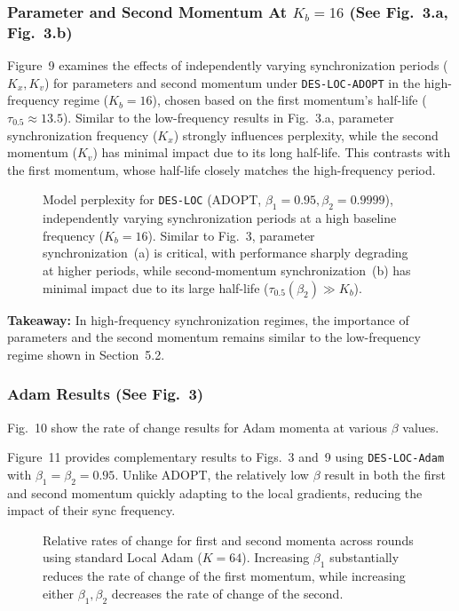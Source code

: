 \subsubsection{Parameter and Second Momentum At $K_b=16$ (See Fig.~3.a, Fig.~3.b)}
\label{sec:b21_param_second}

Figure~9 examines the effects of independently varying synchronization periods ($K_x, K_v$) for parameters and second momentum under \texttt{DES-LOC-ADOPT} in the high-frequency regime ($K_b=16$), chosen based on the first momentum's half-life ($\tau_{0.5}\approx 13.5$). Similar to the low-frequency results in Fig.~3.a, parameter synchronization frequency ($K_x$) strongly influences perplexity, while the second momentum ($K_v$) has minimal impact due to its long half-life. This contrasts with the first momentum, whose half-life closely matches the high-frequency period.

\begin{figure}[ht]
\centering
\caption{Model perplexity for \texttt{DES-LOC} (ADOPT, $\beta_1=0.95, \beta_2=0.9999$), independently varying synchronization periods at a high baseline frequency ($K_b=16$). Similar to Fig.~3, parameter synchronization~(a) is critical, with performance sharply degrading at higher periods, while second-momentum synchronization~(b) has minimal impact due to its large half-life ($\tau_{0.5}(\beta_2)\gg K_b$).}
\label{fig:9}
\end{figure}

\textbf{Takeaway:} In high-frequency synchronization regimes, the importance of parameters and the second momentum remains similar to the low-frequency regime shown in Section~5.2.

\subsubsection{Adam Results (See Fig.~3)}
\label{sec:b22_adam}

Fig.~10 show the rate of change results for Adam momenta at various $\beta$ values.

Figure~11 provides complementary results to Figs.~3 and~9 using \texttt{DES-LOC-Adam} with $\beta_1=\beta_2=0.95$. Unlike ADOPT, the relatively low $\beta$ result in both the first and second momentum quickly adapting to the local gradients, reducing the impact of their sync frequency.

\begin{figure}[ht]
\centering
\caption{Relative rates of change for first and second momenta across rounds using standard Local Adam ($K=64$). Increasing $\beta_1$ substantially reduces the rate of change of the first momentum, while increasing either $\beta_1, \beta_2$ decreases the rate of change of the second.}
\label{fig:10}
\end{figure}

